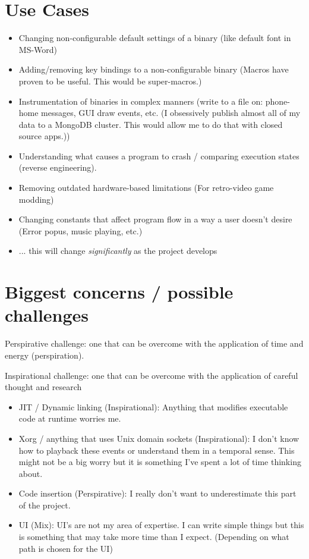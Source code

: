 \section{Use Cases}
\begin{itemize}
    \item Changing non-configurable default settings of a binary (like default font in MS-Word)
    \item Adding/removing key bindings to a non-configurable binary (Macros have proven to be useful. This would be super-macros.)
    \item Instrumentation of binaries in complex manners (write to a file on: phone-home messages, GUI draw events, etc. (I obsessively publish almost all of my data to a MongoDB cluster. This would allow me to do that with closed source apps.))
    \item Understanding what causes a program to crash / comparing execution states (reverse engineering). 
    \item Removing outdated hardware-based limitations (For retro-video game modding)
    \item Changing constants that affect program flow in a way a user doesn't desire (Error popus, music playing, etc.)
    \item ... this will change \textit{significantly} as the project develops
\end{itemize}



\section{Biggest concerns / possible challenges}

Perspirative challenge: one that can be overcome with the application of time and energy (perspiration). 

\noindent Inspirational challenge: one that can be overcome with the application of careful thought and research

\begin{itemize}
    \item JIT / Dynamic linking (Inspirational): Anything that modifies executable code at runtime worries me.
    \item Xorg / anything that uses Unix domain sockets (Inspirational): I don't know how to playback these events or understand them in a temporal sense. This might not be a big worry but it is something I've spent a lot of time thinking about. 
    \item Code insertion (Perspirative): I really don't want to underestimate this part of the project. 
    \item UI (Mix): UI's are not my area of expertise. I can write simple things but this is something that may take more time than I expect. (Depending on what path is chosen for the UI)
\end{itemize}


